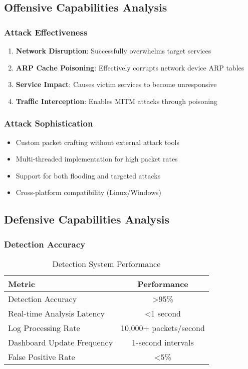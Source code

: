 \documentclass[12pt,a4paper]{article}
\begin{document}
\subsection{Offensive Capabilities Analysis}

\subsubsection{Attack Effectiveness}
\begin{enumerate}
    \item \textbf{Network Disruption}: Successfully overwhelms target services
    \item \textbf{ARP Cache Poisoning}: Effectively corrupts network device ARP tables
    \item \textbf{Service Impact}: Causes victim services to become unresponsive
    \item \textbf{Traffic Interception}: Enables MITM attacks through poisoning
\end{enumerate}

\subsubsection{Attack Sophistication}
\begin{itemize}
    \item Custom packet crafting without external attack tools
    \item Multi-threaded implementation for high packet rates
    \item Support for both flooding and targeted attacks
    \item Cross-platform compatibility (Linux/Windows)
\end{itemize}

\subsection{Defensive Capabilities Analysis}

\subsubsection{Detection Accuracy}
\begin{table}[H]
\centering
\caption{Detection System Performance}
\begin{tabular}{|l|c|}
\hline
\textbf{Metric} & \textbf{Performance} \\
\hline
Detection Accuracy & >95\% \\
\hline
Real-time Analysis Latency & <1 second \\
\hline
Log Processing Rate & 10,000+ packets/second \\
\hline
Dashboard Update Frequency & 1-second intervals \\
\hline
False Positive Rate & <5\% \\
\hline
\end{tabular}
\end{table}
\end{document}
